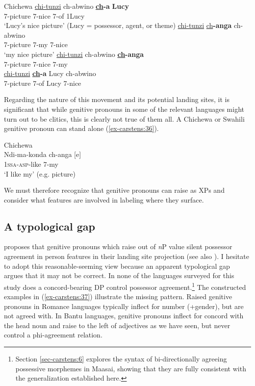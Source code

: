 \documentclass[output=paper
,modfonts
,nonflat]{langsci/langscibook}
\begin{document}
\begin{exe}
	\ex  Chichewa \label{ex-carstens:35}
	\xlist
	\ex
	\gll \uline{chi}\uline{-tunzi}     ch-abwino     \textbf{\uline{ch}-a}   \textbf{Lucy}\\
	7-picture   7-nice         7-of   1Lucy\\
	\glt `Lucy's nice picture'  (Lucy = possessor, agent, or theme) 	
	\ex 
	\gll \uline{chi}\uline{-tunzi}      \uline{ch}\textbf{-anga}     ch-abwino\\
	7-picture   7-my         7-nice\\
	\glt `my nice picture'
	\ex
	\gll  *\uline{chi}\uline{-tunzi}    ch-abwino     \textbf{\uline{ch}-anga}\\
	7-picture   7-nice      7-my\\
	\ex
	\gll  *\uline{chi}\uline{-tunzi}    \textbf{\uline{ch}-a} Lucy     ch-abwino\\
	7-picture   7-of   Lucy   7-nice\\
	\endxlist
\end{exe}
Regarding the nature of this movement and its potential landing sites, it is significant that while genitive pronouns in some of the relevant languages might turn out to be clitics, this is clearly not true of them all. A Chichewa or Swahili genitive pronoun can stand alone (\ref{ex-carstens:36}).

\begin{exe}
\ex Chichewa \citep[295]{Carstens1997}\label{ex-carstens:36}\\
\gll Ndi-ma-konda  ch-anga [e]\\
1\textsc{ssa}-\textsc{asp}-like     7-my\\
\glt *`I like my' (e.g. picture)
\end{exe}
We must therefore recognize that genitive pronouns can raise as XPs and consider what features are involved in labeling where they surface. 

\subsection{A typological gap} \label{sec-carstens:5.2}
\citet{Giusti2008} proposes that genitive pronouns which raise out of \textit{n}P value silent possessor agreement in person features in their landing site projection (see also \citealt{Sichel2002}). I hesitate to adopt this reasonable-seeming view because an apparent typological gap argues that it may not be correct. In none of the languages surveyed for this study does a concord-bearing DP control possessor agreement.\footnote{Section \ref{sec-carstens:6} explores the syntax of bi-directionally agreeing possessive morphemes in Maasai, showing that they are fully consistent with the generalization established here.} The constructed examples in (\ref{ex-carstens:37}) illustrate the missing pattern. Raised genitive pronouns in Romance languages typically inflect for number (+gender), but are not agreed with. In Bantu languages, genitive pronouns inflect for concord with the head noun and raise to the left of adjectives as we have seen, but never control a phi-agreement relation. 
\end{document}

